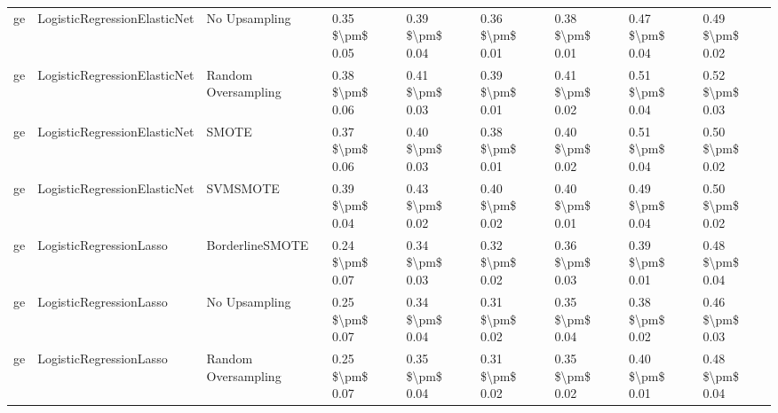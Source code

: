 \begin{tabular}{lllllllll}
      ge &    LogisticRegressionElasticNet &                 No Upsampling &     0.35 \$\textbackslash pm\$ 0.05 &           0.39 \$\textbackslash pm\$ 0.04 &       0.36 \$\textbackslash pm\$ 0.01 &        0.38 \$\textbackslash pm\$ 0.01 &                         0.47 \$\textbackslash pm\$ 0.04 &     0.49 \$\textbackslash pm\$ 0.02 \\
      ge &    LogisticRegressionElasticNet &           Random Oversampling &     0.38 \$\textbackslash pm\$ 0.06 &           0.41 \$\textbackslash pm\$ 0.03 &       0.39 \$\textbackslash pm\$ 0.01 &        0.41 \$\textbackslash pm\$ 0.02 &                         0.51 \$\textbackslash pm\$ 0.04 &     0.52 \$\textbackslash pm\$ 0.03 \\
      ge &    LogisticRegressionElasticNet &                         SMOTE &     0.37 \$\textbackslash pm\$ 0.06 &           0.40 \$\textbackslash pm\$ 0.03 &       0.38 \$\textbackslash pm\$ 0.01 &        0.40 \$\textbackslash pm\$ 0.02 &                         0.51 \$\textbackslash pm\$ 0.04 &     0.50 \$\textbackslash pm\$ 0.02 \\
      ge &    LogisticRegressionElasticNet &                      SVMSMOTE &     0.39 \$\textbackslash pm\$ 0.04 &           0.43 \$\textbackslash pm\$ 0.02 &       0.40 \$\textbackslash pm\$ 0.02 &        0.40 \$\textbackslash pm\$ 0.01 &                         0.49 \$\textbackslash pm\$ 0.04 &     0.50 \$\textbackslash pm\$ 0.02 \\
      ge &         LogisticRegressionLasso &               BorderlineSMOTE &     0.24 \$\textbackslash pm\$ 0.07 &           0.34 \$\textbackslash pm\$ 0.03 &       0.32 \$\textbackslash pm\$ 0.02 &        0.36 \$\textbackslash pm\$ 0.03 &                         0.39 \$\textbackslash pm\$ 0.01 &     0.48 \$\textbackslash pm\$ 0.04 \\
      ge &         LogisticRegressionLasso &                 No Upsampling &     0.25 \$\textbackslash pm\$ 0.07 &           0.34 \$\textbackslash pm\$ 0.04 &       0.31 \$\textbackslash pm\$ 0.02 &        0.35 \$\textbackslash pm\$ 0.04 &                         0.38 \$\textbackslash pm\$ 0.02 &     0.46 \$\textbackslash pm\$ 0.03 \\
      ge &         LogisticRegressionLasso &           Random Oversampling &     0.25 \$\textbackslash pm\$ 0.07 &           0.35 \$\textbackslash pm\$ 0.04 &       0.31 \$\textbackslash pm\$ 0.02 &        0.35 \$\textbackslash pm\$ 0.02 &                         0.40 \$\textbackslash pm\$ 0.01 &     0.48 \$\textbackslash pm\$ 0.04 \\

\end{tabular}
